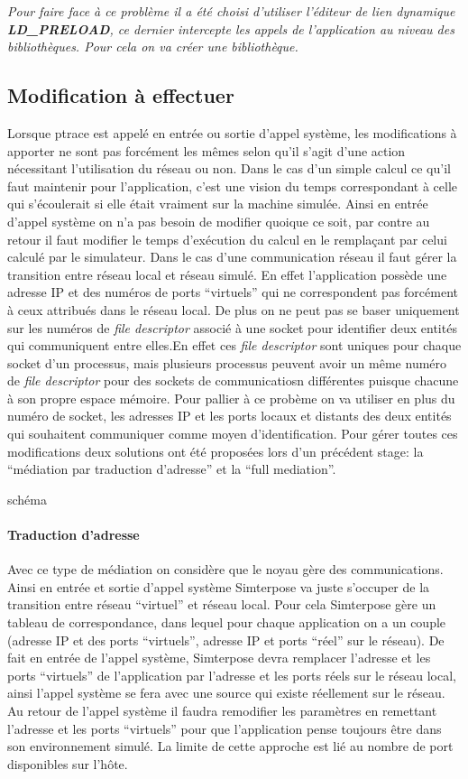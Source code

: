 \textit{Pour faire face à ce problème il a été choisi d'utiliser l'éditeur de
  lien dynamique \textbf{LD\_PRELOAD}, ce dernier intercepte les appels de
  l'application au niveau des bibliothèques. Pour cela on va créer une
  bibliothèque.}

\subsection{Modification à effectuer}
Lorsque ptrace est appelé en entrée ou sortie d'appel système, les modifications
à apporter ne sont pas forcément les mêmes selon qu'il s'agit d'une action
nécessitant l'utilisation du réseau ou non. Dans le cas d'un simple calcul ce
qu'il faut maintenir pour l'application, c'est une vision du temps correspondant
à celle qui s'écoulerait si elle était vraiment sur la machine simulée. Ainsi en
entrée d'appel système on n'a pas besoin de modifier quoique ce soit, par contre
au retour il faut modifier le temps d'exécution du calcul en le remplaçant par
celui calculé par le simulateur. Dans le cas d'une communication réseau il faut
gérer la transition entre réseau local et réseau simulé. En effet l'application
possède une adresse IP et des numéros de ports ``virtuels'' qui ne correspondent
pas forcément à ceux attribués dans le réseau local. De plus on ne peut pas se
baser uniquement sur les numéros de \textit{file descriptor} associé à une
socket pour identifier deux entités qui communiquent entre elles.En effet ces
\textit{file descriptor} sont uniques pour chaque socket d'un processus, mais
plusieurs processus peuvent avoir un même numéro de \textit{file descriptor}
pour des sockets de communicatiosn différentes puisque chacune à son propre
espace mémoire. Pour pallier à ce probème on va utiliser en plus du numéro de
socket, les adresses IP et les ports locaux et distants des deux entités qui
souhaitent communiquer comme moyen d'identification. Pour gérer toutes ces
modifications deux solutions ont été proposées lors d'un précédent stage: la
``médiation par traduction d'adresse'' et la ``full mediation''.

{\color{red}schéma}
\paragraph{Traduction d'adresse}
 Avec ce type de médiation on considère que le noyau gère des
 communications. Ainsi en entrée et sortie d'appel système Simterpose va juste
 s'occuper de la transition entre réseau ``virtuel'' et réseau local. Pour cela
 Simterpose gère un tableau de correspondance, dans lequel pour chaque
 application on a un couple (adresse IP et des ports ``virtuels'', adresse IP et
 ports ``réel'' sur le réseau).  De fait en entrée de l'appel système,
 Simterpose devra remplacer l'adresse et les ports ``virtuels'' de l'application
 par l'adresse et les ports réels sur le réseau local, ainsi l'appel système se
 fera avec une source qui existe réellement sur le réseau. Au retour de l'appel
 système il faudra remodifier les paramètres en remettant l'adresse et les ports
 ``virtuels'' pour que l'application pense toujours être dans son environnement
 simulé.  La limite de cette approche est lié au nombre de port disponibles sur
 l'hôte. \cite{goosen93}

